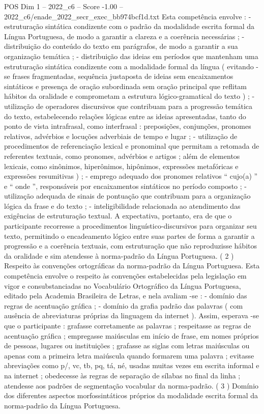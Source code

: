 \begin{textsample}{POS Dim 1 – 2022\_c6 – Score -1.00 – 2022\_c6/enade\_2022\_secr\_exec\_bb974bcf1d.txt}
Esta competência envolve : - estruturação sintática condizente com o padrão da modalidade escrita formal da Língua Portuguesa, de modo a garantir a clareza e a coerência necessárias ; - distribuição do conteúdo do texto em parágrafos, de modo a garantir a sua organização temática ; - distribuição das ideias em períodos que mantenham uma estruturação sintática condizente com a modalidade formal da língua ( evitando -se frases fragmentadas, sequência justaposta de ideias sem encaixamentos sintáticos e presença de oração subordinada sem oração principal que reflitam hábitos da oralidade e comprometam a estrutura lógico-gramatical do texto ) ; - utilização de operadores discursivos que contribuam para a progressão temática do texto, estabelecendo relações lógicas entre as ideias apresentadas, tanto do ponto de vista intrafrasal, como interfrasal : preposições, conjunções, pronomes relativos, advérbios e locuções adverbiais de tempo e lugar ; - utilização de procedimentos de referenciação lexical e pronominal que permitam a retomada de referentes textuais, como pronomes, advérbios e artigos ; além de elementos lexicais, como sinônimos, hiperônimos, hipônimos, expressões metafóricas e expressões resumitivas ) ; - emprego adequado dos pronomes relativos “ cujo(a) ” e “ onde ”, responsáveis por encaixamentos sintáticos no período composto ; - utilização adequada de sinais de pontuação que contribuam para a organização lógica da frase e do texto ; - inteligibilidade relacionada ao atendimento das exigências de estruturação textual.
A expectativa, portanto, era de que o participante recorresse a procedimentos linguístico-discursivos para organizar seu texto, permitindo o encadeamento lógico entre suas partes de forma a garantir a progressão e a coerência textuais, com estruturação que não reproduzisse hábitos da oralidade e sim atendesse à norma-padrão da Língua Portuguesa. ( 2 ) Respeito às convenções ortográficas da norma-padrão da Língua Portuguesa.
Esta competência envolve o respeito às convenções estabelecidas pela legislação em vigor e consubstanciadas no Vocabulário Ortográfico da Língua Portuguesa, editado pela Academia Brasileira de Letras, e nela avaliam -se : - domínio das regras de acentuação gráfica ; - domínio da grafia padrão das palavras ( com ausência de abreviaturas próprias da linguagem da internet ).
Assim, esperava -se que o participante : grafasse corretamente as palavras ; respeitasse as regras de acentuação gráfica ; empregasse maiúsculas em início de frase, em nomes próprios de pessoas, lugares ou instituições ; grafasse as siglas com letras maiúsculas ou apenas com a primeira letra maiúscula quando formarem uma palavra ; evitasse abreviações como p/, vc, tb, pq, tá, né, usadas muitas vezes em escrita informal e na internet ; obedecesse às regras de separação de sílabas no final da linha ; atendesse aos padrões de segmentação vocabular da norma-padrão. ( 3 ) Domínio dos diferentes aspectos morfossintáticos próprios da modalidade escrita formal da norma-padrão da Língua Portuguesa.

\end{textsample}
